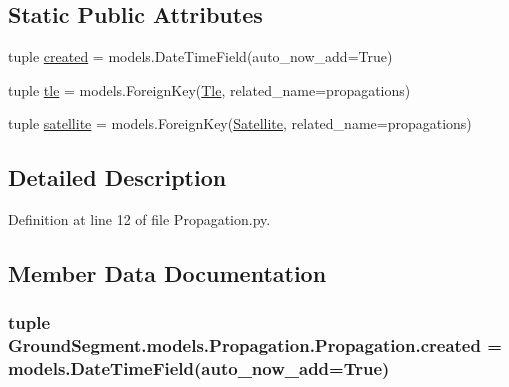 \subsection*{Static Public Attributes}
\begin{DoxyCompactItemize}
\item 
tuple \hyperlink{class_ground_segment_1_1models_1_1_propagation_1_1_propagation_a69d74912f5ef660f55fc9a566df179f3}{created} = models.\+Date\+Time\+Field(auto\+\_\+now\+\_\+add=True)
\item 
tuple \hyperlink{class_ground_segment_1_1models_1_1_propagation_1_1_propagation_a1a194d19e265f4453b3cee0808202e09}{tle} = models.\+Foreign\+Key(\hyperlink{class_ground_segment_1_1models_1_1_tle_1_1_tle}{Tle}, related\+\_\+name=\textquotesingle{}propagations\textquotesingle{})
\item 
tuple \hyperlink{class_ground_segment_1_1models_1_1_propagation_1_1_propagation_a7217452ef0db1bd8ed4a3d113d8bc276}{satellite} = models.\+Foreign\+Key(\hyperlink{class_ground_segment_1_1models_1_1_satellite_1_1_satellite}{Satellite}, related\+\_\+name=\textquotesingle{}propagations\textquotesingle{})
\end{DoxyCompactItemize}


\subsection{Detailed Description}


Definition at line 12 of file Propagation.\+py.



\subsection{Member Data Documentation}
\hypertarget{class_ground_segment_1_1models_1_1_propagation_1_1_propagation_a69d74912f5ef660f55fc9a566df179f3}{}
\subsubsection[{created}]{\setlength{\rightskip}{0pt plus 5cm}tuple Ground\+Segment.\+models.\+Propagation.\+Propagation.\+created = models.\+Date\+Time\+Field(auto\+\_\+now\+\_\+add=True)\hspace{0.3cm}{\ttfamily [static]}}\label{class_ground_segment_1_1models_1_1_propagation_1_1_propagation_a69d74912f5ef660f55fc9a566df179f3}


